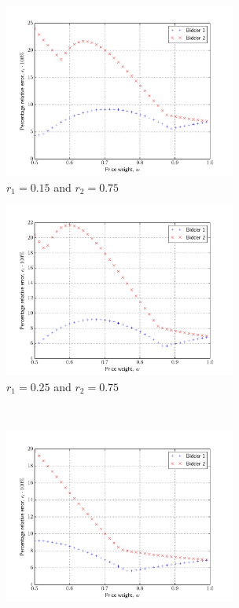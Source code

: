 \begin{figure}[p!]
  \vspace{0.5cm}
  \begin{subfigure}[b]{0.5\textwidth}
    \includegraphics[width=3in]{Approximation/Figures/compare_2_bidders_015_075}
    \caption{$r_1=0.15$ and $r_2=0.75$}
    \label{fig:compare_2_bidders_015_075_approximation}
  \end{subfigure}
  \begin{subfigure}[b]{0.5\textwidth}
    \includegraphics[width=3in]{Approximation/Figures/compare_2_bidders_025_075}
    \caption{$r_1=0.25$ and $r_2=0.75$}
    \label{fig:compare_2_bidders_025_075_approximation}
  \end{subfigure}
  \vspace{0.5cm}\\
  \begin{subfigure}[b]{0.5\textwidth}
    \includegraphics[width=3in]{Approximation/Figures/compare_2_bidders_050_075}

\end{subfigure}
\end{figure}
